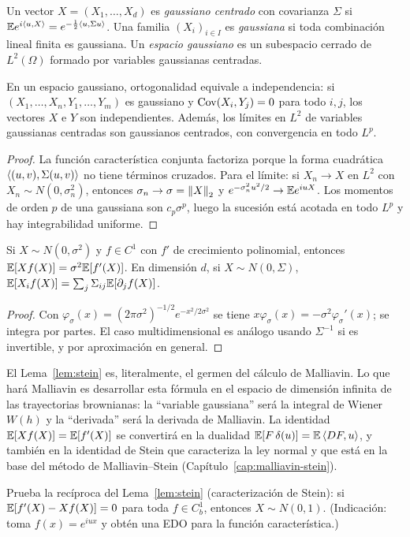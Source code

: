 \begin{definicion}
Un vector $X=(X_1,\dots,X_d)$ es \emph{gaussiano centrado} con covarianza $\Sigma$ si
$\mathbb{E} e^{i\left\langle u, X\right\rangle}=e^{-\frac12\left\langle u, \Sigma u\right\rangle}$. Una familia $(X_i)_{i\in I}$ es \emph{gaussiana} si toda combinación lineal finita es
gaussiana. Un \emph{espacio gaussiano} es un subespacio cerrado de $L^2(\Omega)$ formado por variables
gaussianas centradas.
\end{definicion}

\begin{proposicion}\label{prop:gaussianos}
En un espacio gaussiano, ortogonalidad equivale a independencia: si
$(X_1,\dots,X_n,Y_1,\dots,Y_m)$ es gaussiano y $\operatorname{Cov}(X_i,Y_j)=0$ para todo $i,j$, los vectores $X$ e $Y$ son
independientes. Además, los límites en $L^2$ de variables gaussianas centradas son gaussianos
centrados, con convergencia en todo $L^p$.
\end{proposicion}

\begin{proof}
La función característica conjunta factoriza porque la forma cuadrática
$\left\langle (u,v), \Sigma(u,v)\right\rangle$ no tiene términos cruzados. Para el límite: si $X_n\to X$ en $L^2$ con
$X_n\sim N(0,\sigma_n^2)$, entonces $\sigma_n\to\sigma=\left\lVert X\right\rVert_2$ y $e^{-\sigma_n^2u^2/2}\to\mathbb{E} e^{iuX}$. Los momentos de orden $p$
de una gaussiana son $c_p\sigma^p$, luego la sucesión está acotada en todo $L^p$ y hay integrabilidad
uniforme.
\end{proof}

\begin{lema}\label{lem:stein}
Si $X\sim N(0,\sigma^2)$ y $f\in C^1$
con $f'$ de crecimiento polinomial, entonces $\mathbb{E}[Xf(X)]=\sigma^2\mathbb{E}[f'(X)]$. En dimensión $d$, si
$X\sim N(0,\Sigma)$, $\mathbb{E}[X_if(X)]=\sum_j\Sigma_{ij}\mathbb{E}[\partial_jf(X)]$.
\end{lema}

\begin{proof}
Con $\varphi_\sigma(x)=(2\pi\sigma^2)^{-1/2}e^{-x^2/2\sigma^2}$ se tiene $x\varphi_\sigma(x)=-\sigma^2\varphi_\sigma'(x)$; se integra por
partes. El caso multidimensional es análogo usando $\Sigma^{-1}$ si es invertible, y por aproximación en
general.
\end{proof}

\begin{intuicion}
El Lema~\ref{lem:stein} es, literalmente, el germen del cálculo de Malliavin. Lo que hará Malliavin es
desarrollar esta fórmula en el espacio de dimensión infinita de las trayectorias brownianas:
la ``variable gaussiana'' será la integral de Wiener $W(h)$ y la ``derivada'' será la derivada
de Malliavin. La identidad $\mathbb{E}[Xf(X)]=\mathbb{E}[f'(X)]$ se convertirá en la dualidad $\mathbb{E}[F\,\delta(u)]=
\mathbb{E}\left\langle DF, u\right\rangle$, y también en la identidad de Stein que caracteriza la ley normal y que está en
la base del método de Malliavin--Stein (Capítulo~\ref{cap:malliavin-stein}).
\end{intuicion}

\begin{ejercicio}
Prueba la recíproca del Lema~\ref{lem:stein} (caracterización de Stein): si $\mathbb{E}[f'(X)-
Xf(X)]=0$ para toda $f\in C_b^1$, entonces $X\sim N(0,1)$. (Indicación: toma $f(x)=e^{iux}$ y obtén
una EDO para la función característica.)
\end{ejercicio}
